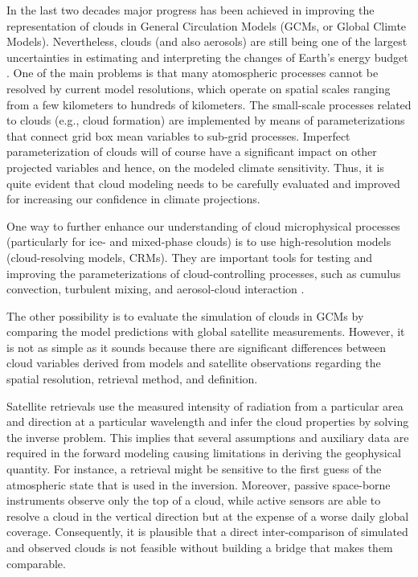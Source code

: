 
In the last two decades major progress has been achieved in improving the representation 
of clouds in General Circulation Models (GCMs, or Global Climte Models). 
Nevertheless, clouds (and also aerosols) are still being one of the largest uncertainties 
in estimating and interpreting the changes of Earth's energy budget \cite{IPCC2013}. 
One of the main problems is that many atomospheric processes cannot be resolved by current model resolutions, 
which operate on spatial scales ranging from a few kilometers to hundreds of kilometers. 
The small-scale processes related to clouds (e.g., cloud formation) 
are implemented by means of parameterizations that connect grid box mean variables to sub-grid processes.
Imperfect parameterization of clouds will of course have a significant impact on other projected variables 
and hence, on the modeled climate sensitivity. 
Thus, it is quite evident that cloud modeling needs to be carefully evaluated and improved 
for increasing our confidence in climate projections.

One way to further enhance our understanding of cloud microphysical processes 
(particularly for ice- and mixed-phase clouds) is to use high-resolution models (cloud-resolving models, CRMs).
They are important tools for testing and improving the parameterizations of cloud-controlling processes,
such as cumulus convection, turbulent mixing, and aerosol-cloud interaction \cite{IPCC2013}.

The other possibility is to evaluate the simulation of clouds in GCMs by comparing
the model predictions with global satellite measurements.
However, it is not as simple as it sounds because there are significant differences
between cloud variables derived from models and satellite observations regarding
the spatial resolution, retrieval method, and definition.

Satellite retrievals use the measured intensity of radiation
from a particular area and direction at a particular wavelength and 
infer the cloud properties by solving the inverse problem.
This implies that several assumptions and auxiliary data are required in the forward modeling
causing limitations in deriving the geophysical quantity. For instance,
a retrieval might be sensitive to the first guess of the atmospheric state that is used in the inversion.
Moreover, passive space-borne instruments observe only the top of a cloud, while active sensors 
are able to resolve a cloud in the vertical direction but at the expense of a worse daily global coverage.
Consequently, it is plausible that a direct inter-comparison of simulated and observed clouds 
is not feasible without building a bridge that makes them comparable.

